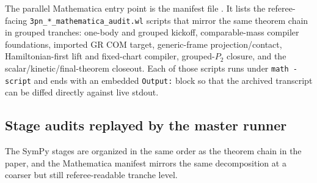 \documentclass[11pt]{article}
\begin{document}
The parallel Mathematica entry point is the manifest file
.  It lists the referee-facing
\texttt{3pn\_*\_mathematica\_audit.wl} scripts that mirror the same theorem
chain in grouped tranches: one-body and grouped kickoff, comparable-mass
compiler foundations, imported GR COM target, generic-frame projection/contact,
Hamiltonian-first lift and fixed-chart compiler, grouped-$P_2$ closure, and the
scalar/kinetic/final-theorem closeout.  Each of those scripts runs under
\texttt{math -script} and ends with an embedded \texttt{Output:} block so that
the archived transcript can be diffed directly against live stdout.

\subsection{Stage audits replayed by the master runner}
\label{sec:verification-stages}

The SymPy stages are organized in the same order as the theorem chain in the
paper, and the Mathematica manifest mirrors the same decomposition at a coarser
but still referee-readable tranche level.
\end{document}
